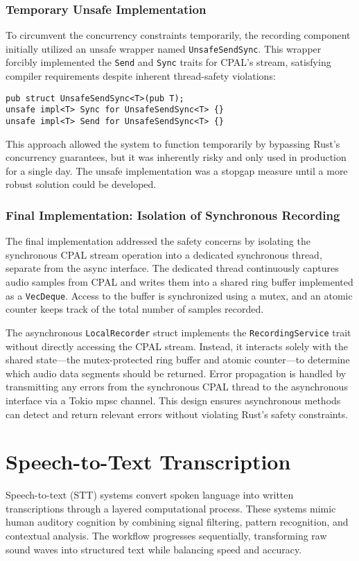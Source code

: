 \subsubsection{Temporary Unsafe Implementation}
To circumvent the concurrency constraints temporarily, the recording component initially utilized an unsafe wrapper named \texttt{UnsafeSendSync}.
This wrapper forcibly implemented the \texttt{Send} and \texttt{Sync} traits for CPAL's stream, satisfying compiler requirements despite inherent thread-safety violations:

\begin{verbatim}
pub struct UnsafeSendSync<T>(pub T);
unsafe impl<T> Sync for UnsafeSendSync<T> {}
unsafe impl<T> Send for UnsafeSendSync<T> {}
\end{verbatim}

This approach allowed the system to function temporarily by bypassing Rust's concurrency guarantees, but it was inherently risky and only used in production for a single day. The unsafe implementation was a stopgap measure until a more robust solution could be developed.

\subsubsection{Final Implementation: Isolation of Synchronous Recording}
The final implementation addressed the safety concerns by isolating the synchronous CPAL stream operation into a dedicated synchronous thread, separate from the async interface.
The dedicated thread continuously captures audio samples from CPAL and writes them into a shared ring buffer implemented as a \texttt{VecDeque}.
Access to the buffer is synchronized using a mutex, and an atomic counter keeps track of the total number of samples recorded.

The asynchronous \texttt{LocalRecorder} struct implements the \texttt{RecordingService} trait without directly accessing the CPAL stream.
Instead, it interacts solely with the shared state—the mutex-protected ring buffer and atomic counter—to determine which audio data segments should be returned.
Error propagation is handled by transmitting any errors from the synchronous CPAL thread to the asynchronous interface via a Tokio mpsc channel.
This design ensures asynchronous methods can detect and return relevant errors without violating Rust's safety constraints.

\section{Speech-to-Text Transcription}
Speech-to-text (STT) systems convert spoken language into written transcriptions through a layered computational process.
These systems mimic human auditory cognition by combining signal filtering, pattern recognition, and contextual analysis.
The workflow progresses sequentially, transforming raw sound waves into structured text while balancing speed and accuracy.

